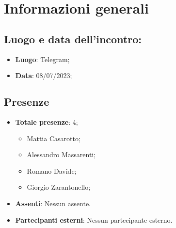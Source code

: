 \section{Informazioni generali}
    \subsection{Luogo e data dell'incontro:}
    \begin{itemize}
        \item \textbf{Luogo}: Telegram;
        \item \textbf{Data}: 08/07/2023;
    \end{itemize}
    \subsection{Presenze}
    \begin{itemize}
        \item \textbf{Totale presenze}: 4;
        \begin{itemize}
            \item Mattia Casarotto;
            \item Alessandro Massarenti;
            \item Romano Davide;
            \item Giorgio Zarantonello;
        \end{itemize}
        \item \textbf{Assenti}: Nessun assente.
        \item \textbf{Partecipanti esterni}: Nessun partecipante esterno.
    \end{itemize}